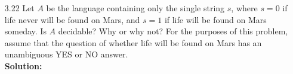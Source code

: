 \begin{enumerate}
\item[3.22]Let $A$ be the language containing only the single string $s$, where $s = 0$ if life never will be found on Mars, and $s = 1$ if life will be found on Mars someday. Is $A$ decidable? Why or why not? For the purposes of this problem, assume that the question of whether life will be found on Mars has an unambiguous YES or NO answer.
\\
\textbf{Solution:} \alreadyanswered

\end{enumerate}